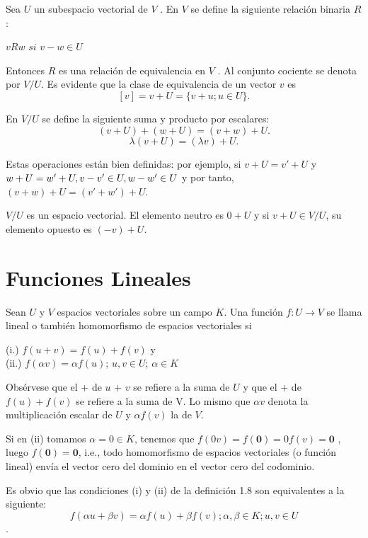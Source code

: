 		\begin{defi}
			Sea $U$ un subespacio vectorial de $V$ . En $V$ se define la siguiente
			relación binaria $R$: 
			 \begin{center}
			 	$vRw$  $si$  $v - w \in U $
			 \end{center}
			Entonces $R$ es una relación de equivalencia en $V$ . Al conjunto cociente se denota
			por $V/U$. Es evidente que la clase de equivalencia de un vector $v$ es
			\[ [v] = v + U = \{v + u; u \in U\}. \]
			
			En $V/U$ se define la siguiente suma y producto por escalares:
			\[ (v + U) + (w + U) = (v + w) + U. \]
			\[ \lambda{(v + U)} = (\lambda{v}) + U. \]
			
			Estas operaciones están bien definidas: por ejemplo, si $v + U = v' + U$ y $w + U =\\
			w' + U, v - v' \in U, w - w' \in U$ y por tanto, $(v + w) + U = (v' + w') + U$.
		\end{defi}
		\begin{pro}
			$V/U$ es un espacio vectorial. El elemento neutro es $0 + U$ y si
			$v + U \in V/U$, su elemento opuesto es $(-v) + U$.
		\end{pro}
		\section{Funciones Lineales}
			\begin{defi}
				Sean $U$ y $ V $ espacios vectoriales sobre un campo $ K $. Una función $ f:U \rightarrow V $ 
				se llama lineal o también homomorfismo  de espacios vectoriales si   
				
						\normalfont 
						(i.) $ f(u + v) = f(u) + f(v) $ y\\
						(ii.) $ f(\alpha v) = \alpha f(u)  $;    $ u, v \in U$;    $ \alpha \in K $
			\end{defi}
				Obsérvese que el + de $ u $ + $ v $ se refiere a la suma de $ U $ y que el + de $ f(u) + f(v)  $ se refiere a la suma de V. Lo mismo que $ \alpha v $ denota la multiplicación escalar de $  U $ y $ \alpha f(v) $ la de $ V $.
				
				Si en (ii) tomamos $ \alpha = 0 \in K $, tenemos que $ f(0v) = f(\mathbf{0}) = 0 f(v) = \mathbf{0} $ , luego $ f(\mathbf{0}) = \mathbf{0} $, i.e., todo homomorfismo de espacios vectoriales (o función lineal) envía el vector cero del dominio en el vector cero del codominio.
				
				Es obvio que las condiciones (i) y (ii) de la definición 1.8 son equivalentes a la siguiente:
				\[ f(\alpha u + \beta v) = \alpha f(u) + \beta f(v); \alpha, \beta \in K ; u,v \in U\].
				
